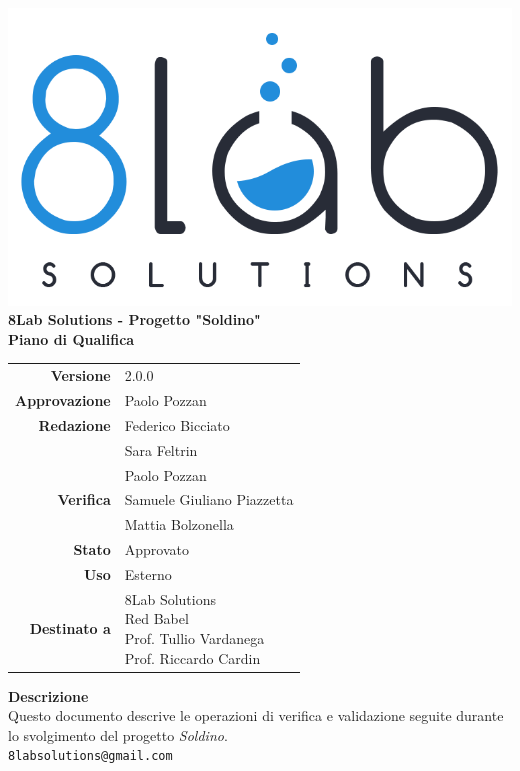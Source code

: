 \thispagestyle{empty}
\begin{titlepage}
	\begin{center}
		\includegraphics[scale = 0.3]{res/images/logo8_crop.png}\\
		\large \textbf{8Lab Solutions - Progetto "Soldino"} \\
		\vfill
		\Huge \textbf{Piano di Qualifica}
		\vspace*{\fill} 
        \vfill
        \large
        \begin{tabular}{r|l}
                        \textbf{Versione} & 2.0.0\\
                        \textbf{Approvazione} & Paolo Pozzan\\
                        \textbf{Redazione} & Federico Bicciato\\&
                        	Sara Feltrin\\&
                        	Paolo Pozzan\\
                        \textbf{Verifica} & Samuele Giuliano Piazzetta \\&
                        	Mattia Bolzonella\\
                        \textbf{Stato} & Approvato\\
                        \textbf{Uso} & Esterno\\
                        \textbf{Destinato a} & \parbox[t]{5cm}{8Lab Solutions\\Red Babel\\Prof. Tullio Vardanega\\Prof. Riccardo Cardin}
                \end{tabular}
                \vfill
                \normalsize
                \textbf{Descrizione}\\
                Questo documento descrive le operazioni di verifica e validazione seguite durante lo svolgimento del progetto \textit{Soldino}.\\
                \vfill
                \small
                \texttt{8labsolutions@gmail.com}
	\end{center}
\end{titlepage}